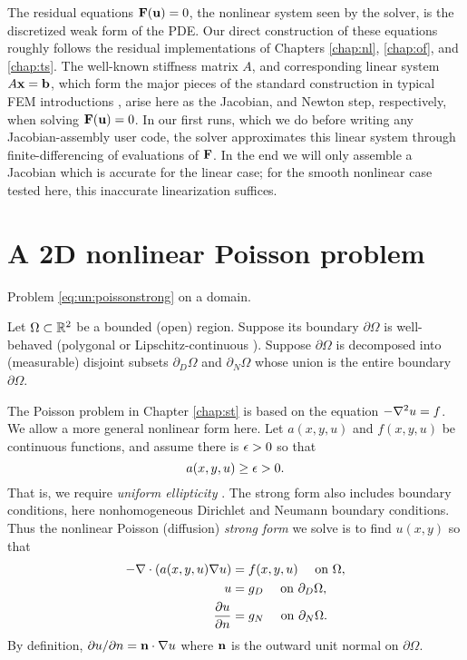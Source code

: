 The residual equations $\mathbf{F}(\mathbf{u})=0$, the nonlinear system seen by the \pSNES solver, is the discretized weak form of the PDE.  Our direct construction of these equations roughly follows the residual implementations of Chapters \ref{chap:nl}, \ref{chap:of}, and \ref{chap:ts}.  The well-known stiffness matrix $A$, and corresponding linear system $A\mathbf{x} = \mathbf{b}$, which form the major pieces of the standard construction in typical FEM introductions \citep{Braess2007,Elmanetal2005}, arise here as the Jacobian, and Newton step, respectively, when solving $\mathbf{F}(\mathbf{u})=0$.  In our first runs, which we do before writing any Jacobian-assembly user code, the \pSNES solver approximates this linear system through finite-differencing of evaluations of $\mathbf{F}$.  In the end we will only assemble a Jacobian which is accurate for the linear case; for the smooth nonlinear case tested here, this inaccurate linearization suffices.


\section{A 2D nonlinear Poisson problem}

\begin{marginfigure}

\caption{Problem \eqref{eq:un:poissonstrong} on a domain.}
\label{fig:un:generalpoissondomain}
\end{marginfigure}

Let $\Omega \subset \mathbb{R}^2$ be a bounded (open) region.  Suppose its boundary $\partial\Omega$ is well-behaved (polygonal or Lipschitz-continuous \citep[section 1.2]{Ciarlet2002}).  Suppose $\partial\Omega$ is decomposed into (measurable) disjoint subsets $\partial_D \Omega$ and $\partial_N \Omega$ whose union is the entire boundary $\partial \Omega$.

The Poisson problem in Chapter \ref{chap:st} is based on the equation $- \nabla^2 u = f$.  We allow a more general nonlinear form here.  Let $a(x,y,u)$ and $f(x,y,u)$ be continuous functions, and assume there is $\epsilon>0$ so that
    $$a(x,y,u) \ge \epsilon > 0.$$
That is, we require \emph{uniform ellipticity} \citep{Evans2010}.  The strong form also includes boundary conditions, here nonhomogeneous Dirichlet and Neumann boundary conditions.  Thus the  nonlinear Poisson (diffusion) \emph{strong form} we solve is to find $u(x,y)$ so that
\begin{align}
- \nabla\cdot \left(a(x,y,u) \nabla u\right) &= f(x,y,u) \quad \text{ on } \Omega, \label{eq:un:poissonstrong} \\
u &= g_D \quad \text{ on } \partial_D \Omega, \notag \\
\frac{\partial u}{\partial n} &= g_N \quad \text{ on } \partial_N \Omega. \notag
\end{align}
By definition, $\partial u/\partial n = \mathbf{n} \cdot \nabla u$ where $\mathbf{n}$ is the outward unit normal on $\partial \Omega$.

